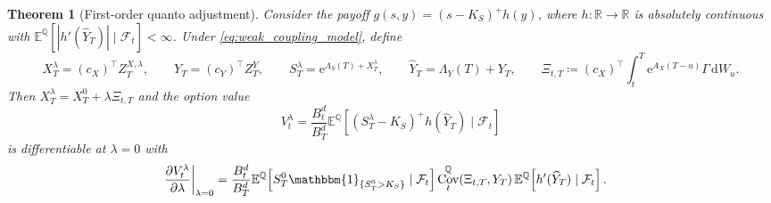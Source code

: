 \documentclass[10pt,reqno]{amsart}
\newtheorem{theorem}{Theorem}[section]
\newcommand{\R}{\mathbb{R}}
\newcommand{\E}{\mathbb{E}}
\newcommand{\Q}{\mathbb{Q}}
\newcommand{\F}{\mathcal{F}}
\newcommand{\1}{\mathbbm{1}}
\newcommand{\dd}{\mathrm{d}}
\newcommand{\ee}{\mathrm{e}}
\DeclareMathOperator{\Cov}{Cov}
\begin{document}
\begin{theorem}[First-order quanto adjustment]
\label{thm:weak_coupling}
Consider the payoff $g(s,y)=(s-K_S)^+h(y)$, where
$h:\R\to\R$ is absolutely continuous with
$\E^\Q[|h'(\widehat{Y}_T)| \mid \F_t] < \infty$. Under
\eqref{eq:weak_coupling_model}, define
$$
X_T^\lambda = (c_X)^\top Z_T^{X,\lambda},\qquad
Y_T = (c_Y)^\top Z_T^Y,\qquad
S_T^\lambda = \ee^{\Lambda_S(T)+X_T^\lambda},
\qquad
\widehat{Y}_T = \Lambda_Y(T)+Y_T,
\qquad
\Xi_{t,T} \coloneqq (c_X)^\top \int_t^T \ee^{A_X(T-u)} \Gamma\,\dd W_u.
$$
Then $X_T^\lambda = X_T^0 + \lambda \Xi_{t,T}$ and the option value
$$
V_t^\lambda
= \frac{B_t^d}{B_T^d}\E^\Q\!\left[(S_T^\lambda-K_S)^+h(\widehat{Y}_T)\mid\F_t\right]
$$
is differentiable at $\lambda=0$ with
\begin{align}
  \left.\frac{\partial V_t^\lambda}{\partial \lambda}\right|_{\lambda=0}
  &= \frac{B_t^d}{B_T^d}
     \E^\Q\!\left[S_T^0 \1_{\{S_T^0>K_S\}}\mid\F_t\right]
     \Cov_t^\Q(\Xi_{t,T},Y_T)\,
     \E^\Q\!\left[h'(\widehat{Y}_T)\mid\F_t\right].
     \label{eq:weak_coupling_price_adjustment}
\end{align}
\end{theorem}
\end{document}
